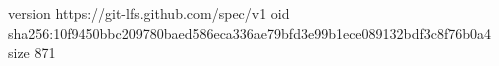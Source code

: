 version https://git-lfs.github.com/spec/v1
oid sha256:10f9450bbc209780baed586eca336ae79bfd3e99b1ece089132bdf3c8f76b0a4
size 871
